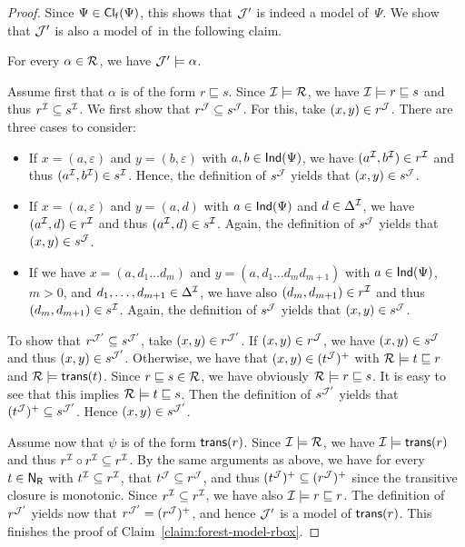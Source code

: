 \begin{proof}
    Since $\Psi\in\operatorname{\mathsf{Cl_f}}(\Psi)$, this shows that $\mathcal{J}'$ is indeed a model
    of~$\Psi$.
    We show that $\mathcal{J}'$ is also a model of~\Rmc in the following claim.

    \begin{claim}\label{claim:forest-model-rbox}
        For every $\alpha\in\mathcal{R}$, we have $\mathcal{J}'\models\alpha$.
    \end{claim}

    \noindent
    Assume first that $\alpha$ is of the form $r\sqsubseteq s$.  Since
    $\mathcal{I}\models\mathcal{R}$, we have $\mathcal{I}\models r\sqsubseteq s$ and thus
    $r^\mathcal{I}\subseteq s^\mathcal{I}$.  We first show that $r^\mathcal{J}\subseteq s^\mathcal{J}$.  For
    this, take $(x,y)\in r^\mathcal{J}$.  There are three cases to consider:
    \begin{itemize}
        \item If $x=(a,\varepsilon)$ and $y=(b,\varepsilon)$ with
            $a,b\in\mathsf{Ind}(\Psi)$, we have $(a^\mathcal{I},b^\mathcal{I})\in r^\mathcal{I}$ and thus
            $(a^\mathcal{I},b^\mathcal{I})\in s^\mathcal{I}$.  Hence, the definition of $s^\mathcal{J}$
            yields that $(x,y)\in s^\mathcal{J}$.
        \item If $x=(a,\varepsilon)$ and $y=(a,d)$ with
            $a\in\mathsf{Ind}(\Psi)$ and $d\in\Delta^\mathcal{I}$, we have $(a^\mathcal{I},d)\in
            r^\mathcal{I}$ and thus $(a^\mathcal{I},d)\in s^\mathcal{I}$.  Again, the definition of
            $s^\mathcal{J}$ yields that $(x,y)\in s^\mathcal{J}$.
        \item If we have $x=(a,d_1\dots d_m)$ and $y=(a,d_1\dots d_m d_{m+1})$
            with $a\in\mathsf{Ind}(\Psi)$, $m>0$, and $d_1,\dots,d_{m+1}\in\Delta^\mathcal{I}$,
            we have also $(d_m,d_{m+1})\in r^\mathcal{I}$ and thus
            $(d_m,d_{m+1})\in s^\mathcal{I}$.  Again, the definition of $s^\mathcal{J}$ yields
            that $(x,y)\in s^\mathcal{J}$.
    \end{itemize}
    To show that $r^{\mathcal{J}'}\subseteq s^{\mathcal{J}'}$, take $(x,y)\in r^{\mathcal{J}'}$.  If
    $(x,y)\in r^\mathcal{J}$, we have $(x,y)\in s^\mathcal{J}$ and thus $(x,y)\in s^{\mathcal{J}'}$.
    Otherwise, we have that $(x,y)\in(t^\mathcal{J})^+$ with $\mathcal{R}\models t\sqsubseteq
    r$ and $\mathcal{R}\models\mathsf{trans}(t)$.  Since $r\sqsubseteq s\in\mathcal{R}$, we have
    obviously $\mathcal{R}\models r\sqsubseteq s$.  It is easy to see that this implies
    $\mathcal{R}\models t\sqsubseteq s$.  Then the definition of $s^{\mathcal{J}'}$ yields
    that $(t^\mathcal{J})^+\subseteq s^{\mathcal{J}'}$.  Hence $(x,y)\in s^{\mathcal{J}'}$.

    Assume now that $\psi$ is of the form $\mathsf{trans}(r)$.  Since $\mathcal{I}\models\mathcal{R}$,
    we have $\mathcal{I}\models\mathsf{trans}(r)$ and thus $r^\mathcal{I}\circ r^\mathcal{I}\subseteq
    r^\mathcal{I}$.  By the same arguments as above, we have for every $t\in\mathsf{N_R}$ with
    $t^\mathcal{I}\subseteq r^\mathcal{I}$, that $t^\mathcal{J}\subseteq r^\mathcal{J}$, and thus
    $(t^\mathcal{J})^+\subseteq(r^\mathcal{J})^+$ since the transitive closure is monotonic.
    Since $r^\mathcal{I}\subseteq r^\mathcal{I}$, we have also $\mathcal{I}\models r\sqsubseteq r$.
    The definition of $r^{\mathcal{J}'}$ yields now that $r^{\mathcal{J}'}=(r^\mathcal{J})^+$, and
    hence $\mathcal{J}'$ is a model of $\mathsf{trans}(r)$.
    This finishes the proof of Claim~\ref{claim:forest-model-rbox}.


\end{proof}
